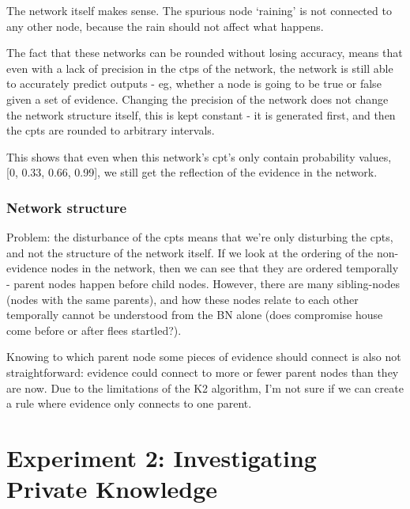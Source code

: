 The network itself makes sense. The spurious node `raining' is not connected to any other node, because the rain should not affect what happens.

The fact that these networks can be rounded without losing accuracy, means that even with a lack of precision in the ctps of the network, the network is still able to accurately predict outputs - eg, whether a node is going to be true or false given a set of evidence. Changing the precision of the network does not change the network structure itself, this is kept constant - it is generated first, and then the cpts are rounded to arbitrary intervals. 

This shows that even when this network's cpt's only contain probability values, [0, 0.33, 0.66, 0.99], we still get the reflection of the evidence in the network. 

\subsubsection{Network structure}

Problem: the disturbance of the cpts means that we're only disturbing the cpts, and not the structure of the network itself. If we look at the ordering of the non-evidence nodes in the network, then we can see that they are ordered temporally - parent nodes happen before child nodes. However, there are many sibling-nodes (nodes with the same parents), and how these nodes relate to each other temporally cannot be understood from the BN alone (does compromise house come before or after flees startled?). 

Knowing to which parent node some pieces of evidence should connect is also not straightforward: evidence could connect to more or fewer parent nodes than they are now. Due to the limitations of the K2 algorithm, I'm not sure if we can create a rule where evidence only connects to one parent.



\section{Experiment 2: Investigating Private Knowledge}

